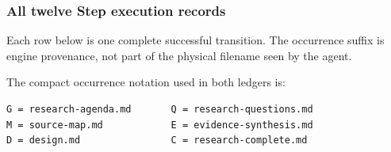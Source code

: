 \documentclass[11pt]{article}
\begin{document}
\subsubsection{All twelve Step execution records}

Each row below is one complete successful transition. The occurrence suffix is
engine provenance, not part of the physical filename seen by the agent.

The compact occurrence notation used in both ledgers is:

\begin{lstlisting}[style=playbook]
G = research-agenda.md       Q = research-questions.md
M = source-map.md            E = evidence-synthesis.md
D = design.md                C = research-complete.md
\end{lstlisting}
\end{document}

